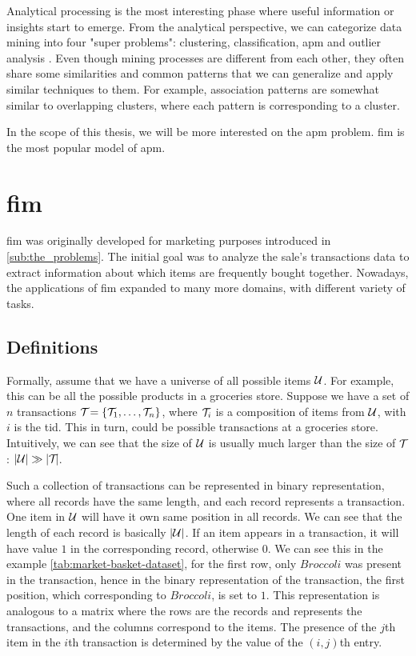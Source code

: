 Analytical processing is the most interesting phase where useful information or insights start to emerge.
From the analytical perspective, we can categorize data mining into four "super problems": clustering, classification, \ac{apm} and outlier analysis \citep{Aggarwal15}.
Even though mining processes are different from each other, they often share some similarities and common patterns that we can generalize and apply similar techniques to them.
For example, association patterns are somewhat similar to overlapping clusters, where each pattern is corresponding to a cluster.

In the scope of this thesis, we will be more interested on the \acl{apm} problem.
\Acl{fim} \citep{borgelt_fim_2012} is the most popular model of \acl{apm}.


\section{\Acl{fim}}
\label{sec:fim}
\Acl{fim} was originally developed for marketing purposes introduced in \autoref{sub:the_problems}.
The initial goal was to analyze the sale's transactions data to extract information about which items are frequently bought together.
Nowadays, the applications of \acl{fim} expanded to many more domains, with different variety of tasks.

\subsection{Definitions}
Formally, assume that we have a universe of all possible items $\mathcal{U}$.
For example, this can be all the possible products in a groceries store.
Suppose we have a set of $\mathit{n}$ transactions $\mathcal{T}_{} = \{\mathcal{T}_{1}, \dots, \mathcal{T}_{n}\}{}$, where $\mathcal{T}_{i}$ is a composition of items from $\mathcal{U}$, with $i$ is the \ac{tid}.
This in turn, could be possible transactions at a groceries store.
Intuitively, we can see that the size of $\mathcal{U}$ is usually much larger than the size of $\mathcal{T}_{}$: $|\mathcal{U}| \gg |\mathcal{T}_{} |$.

Such a collection of transactions can be represented in binary representation, where all records have the same length, and each record represents a transaction.
One item in $\mathcal{U}$ will have it own same position in all records.
We can see that the length of each record is basically $|\mathcal{U}|$.
If an item appears in a transaction, it will have value $1$ in the corresponding record, otherwise $0$.
We can see this in the example \autoref{tab:market-basket-dataset}, for the first row, only $Broccoli$ was present in the transaction, hence in the binary representation of the transaction, the first position, which corresponding to $Broccoli$, is set to $1$.
This representation is analogous to a matrix where the rows are the records and represents the transactions, and the columns correspond to the items.
The presence of the $\mathit{j}$th item in the $\mathit{i}$th transaction is determined by the value of the $\mathit{(i, j)}$th entry.

